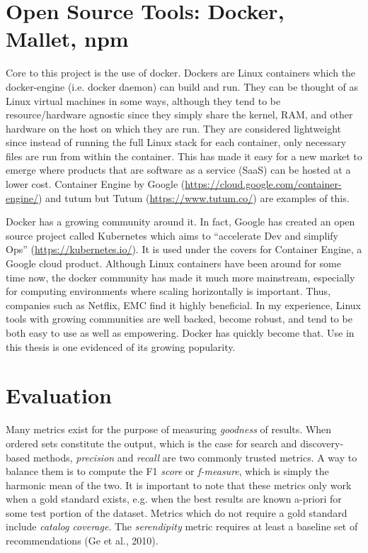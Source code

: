 \section{Open Source Tools: Docker, Mallet, npm}
Core to this project is the use of docker. Dockers are Linux containers which the docker-engine (i.e. docker daemon) can build and run. They can be thought of as Linux virtual machines in some ways, although they tend to be resource/hardware agnostic since they simply share the kernel, RAM, and other hardware on the host on which they are run. They are considered lightweight since instead of running the full Linux stack for each container, only necessary files are run from within the container. This has made it easy for a new market to emerge where products that are software as a service (SaaS) can be hosted at a lower cost. Container Engine by Google (\url{https://cloud.google.com/container-engine/}) and tutum but Tutum (\url{https://www.tutum.co/}) are examples of this.

Docker has a growing community around it. In fact, Google has created an open source project called Kubernetes which aims to ``accelerate Dev and simplify Ops'' (\url{https://kubernetes.io/}). It is used under the covers for Container Engine, a Google cloud product. Although Linux containers have been around for some time now, the docker community has made it much more mainstream, especially for computing environments where scaling horizontally is important. Thus, companies such as Netflix, EMC find it highly beneficial. In my experience, Linux tools with growing communities are well backed, become robust, and tend to be both easy to use as well as empowering.
Docker has quickly become that. Use in this thesis is one evidenced of its growing popularity. %

\section{Evaluation}

Many metrics exist for the purpose of measuring \textit{goodness} of results. When ordered sets constitute the output, which is the case for search and discovery-based methods, \textit{precision} and \textit{recall} are two commonly trusted metrics. A way to balance them is to compute the F1 \textit{score} or \textit{f-measure}, which is simply the harmonic mean of the two. It is important to note that these metrics only work when a gold standard exists, e.g. when the best results are known a-priori for some test portion of the dataset. Metrics which do not require a gold standard include \textit{catalog coverage}. The \textit{serendipity} metric requires at least a baseline set of recommendations (Ge et al., 2010).

